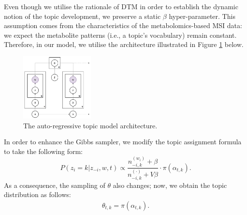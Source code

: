 \documentclass{mpaper}
\begin{document}
\par Even though we utilise the rationale of DTM in order to establish the dynamic notion of the topic development, we preserve a static $\beta$ hyper-parameter. This assumption comes from the characteristics of the metabolomics-based MSI data: we expect the metabolite patterns (i.e., a topic's vocabulary) remain constant. Therefore, in our model, we utilise the architecture illustrated in Figure \ref{fig:arch_ar} below.
\begin{figure}[H]
  \centering
  \includegraphics[width=0.33\textwidth]{ar-architecture.png}
  \caption{The auto-regressive topic model architecture.}
  \label{fig:arch_ar}
\end{figure}

\par In order to enhance the Gibbs sampler, we modify the topic assignment formula to take the following form:
\begin{equation*}
P(z_i = k | z_{-i}, w, t) \propto \dfrac{n_{-i, k}^{(w_i)} + \beta}{n_{-i, k}^{(\cdot)} + V\beta}\cdot \pi(\alpha_{t,k}).
\end{equation*}
As a consequence, the sampling of $\theta$ also changes; now, we obtain the topic distribution as follows:
\begin{align*}
\theta_{t,k} = \pi(\alpha_{t,k}).
\end{align*}
\end{document}
